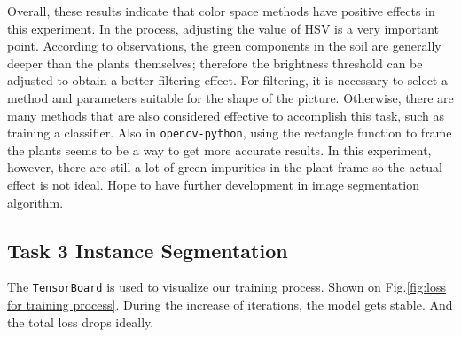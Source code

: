 \documentclass[conference]{IEEEtran}
\begin{document}
Overall, these results indicate that color space methods have positive effects in this experiment. In the process, adjusting the value of HSV is a very important point. According to observations, the green components in the soil are generally deeper than the plants themselves; therefore the brightness threshold can be adjusted to obtain a better filtering effect. For filtering, it is necessary to select a method and parameters suitable for the shape of the picture. Otherwise, there are many methods that are also considered effective to accomplish this task, such as training a classifier. Also in \verb|opencv-python|, using the rectangle function to frame the plants seems to be a way to get more accurate results. In this experiment, however, there are still a lot of green impurities in the plant frame so the actual effect is not ideal. Hope to have further development in image segmentation algorithm.

\subsection{Task 3 Instance Segmentation}

The \verb|TensorBoard| is used to visualize our training process.
Shown on Fig.\ref{fig:loss for training process}.
During the increase of iterations, the model gets stable.
And the total loss drops ideally.
\end{document}
